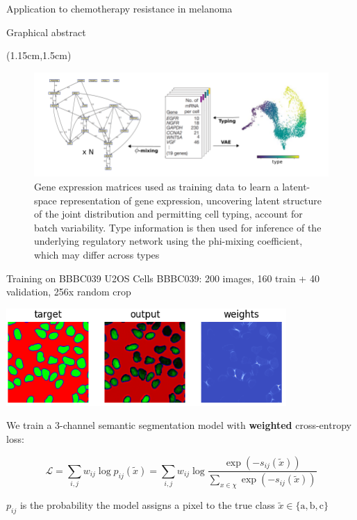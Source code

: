 \documentclass[aspectratio=1610]{beamer}					%
\begin{document}
\begin{section}{Application to chemotherapy resistance in melanoma}
\begin{frame}{Graphical abstract}

\begin{textblock*}{14cm}(1.15cm,1.5cm)
\begin{figure}
\includegraphics[width=14cm]{sketch.png}
\caption{Gene expression matrices used as training data to learn a latent-space representation of gene expression, uncovering latent structure of the joint distribution and permitting cell typing, account for batch variability. Type information is then used for inference of the underlying regulatory network using the phi-mixing coefficient, which may differ across types}
\end{figure}
\end{textblock*}

\end{frame}
\end{section}

\begin{frame}{Training on BBBC039 U2OS Cells}
\vspace{0.1in}
BBBC039: 200 images, 160 train + 40 validation, 256\;x random crop

\begin{center}
\includegraphics[width=0.8\textwidth]{weights.png}
\end{center}

We train a 3-channel semantic segmentation model with \textbf{weighted} cross-entropy loss:

\begin{equation*}
\mathcal{L} = \sum_{i,j} w_{ij}\log p_{ij}(\tilde{x}) = \sum_{i,j} w_{ij}\log \frac{\exp(-s_{ij}(\tilde{x}))}{\sum_{x\in\chi} \exp(-s_{ij}(\tilde{x}))}
\end{equation*}

$p_{ij}$ is the probability the model assigns a pixel to the true class $\tilde{x} \in \{\textrm{a}, \textrm{b}, \textrm{c}\}$

\end{frame}
\end{document}
